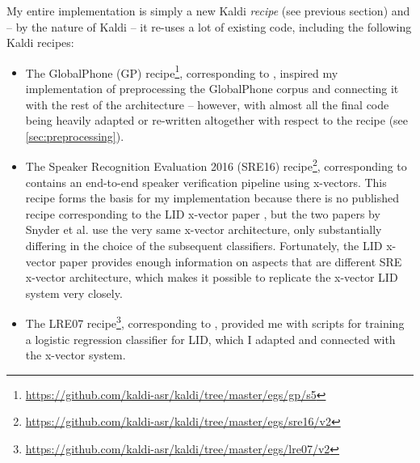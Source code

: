 \documentclass[bsc,frontabs,twoside,singlespacing,parskip,deptreport]{infthesis}
\begin{document}
{{    My entire implementation is simply a new Kaldi \textit{recipe} (see previous section) and -- by the nature of Kaldi -- it re-uses a lot of existing code, including the following Kaldi recipes:
    \begin{itemize}
      \item {The GlobalPhone (GP) recipe\footnote{\url{https://github.com/kaldi-asr/kaldi/tree/master/egs/gp/s5}}, corresponding to \citet{Lu_et_al_2012}, inspired my implementation of preprocessing the GlobalPhone corpus and connecting it with the rest of the architecture -- however, with almost all the final code being heavily adapted or re-written altogether with respect to the recipe (see \autoref{sec:preprocessing}).}

      \item {The Speaker Recognition Evaluation 2016 (SRE16) recipe\footnote{\url{https://github.com/kaldi-asr/kaldi/tree/master/egs/sre16/v2}}, corresponding to \citet{Snyder_et_al_2018b} contains an end-to-end speaker verification pipeline using x-vectors. This recipe forms the basis for my implementation because there is no published recipe corresponding to the LID x-vector paper \citep{Snyder_et_al_2018}, but the two papers by Snyder et al. use the very same x-vector architecture, only substantially differing in the choice of the subsequent classifiers. Fortunately, the LID x-vector paper provides enough information on aspects that are different SRE x-vector architecture, which makes it possible to replicate the x-vector LID system very closely.}

      \item {The LRE07 recipe\footnote{\url{https://github.com/kaldi-asr/kaldi/tree/master/egs/lre07/v2}}, corresponding to \citet{Sarma_et_al_2018}, provided me with scripts for training a logistic regression classifier for LID, which I adapted and connected with the x-vector system.}

    \end{itemize}
    
}}
\end{document}
